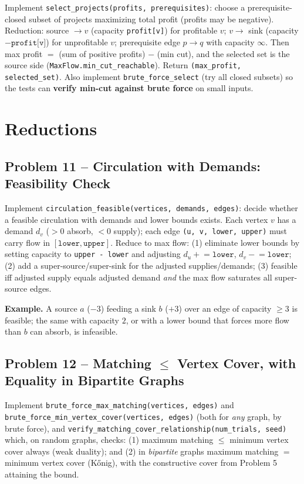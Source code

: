 \documentclass[11pt]{article}
\begin{document}
Implement \texttt{select\_projects(profits, prerequisites)}: choose a prerequisite-closed
subset of projects maximizing total profit (profits may be negative). Reduction: source
$\to v$ (capacity \texttt{profit[v]}) for profitable $v$; $v \to$ sink (capacity
$-\texttt{profit[v]}$) for unprofitable $v$; prerequisite edge $p \to q$ with capacity
$\infty$. Then max profit $=$ (sum of positive profits) $-$ (min cut), and the selected
set is the source side (\texttt{MaxFlow.min\_cut\_reachable}). Return
\texttt{(max\_profit, selected\_set)}. Also implement \texttt{brute\_force\_select} (try
all closed subsets) so the tests can \textbf{verify min-cut against brute force} on small
inputs.

\newpage
\section{Reductions}

\subsection*{Problem 11 -- Circulation with Demands: Feasibility Check}

Implement \texttt{circulation\_feasible(vertices, demands, edges)}: decide whether a
feasible circulation with demands and lower bounds exists. Each vertex $v$ has a demand
$d_v$ ($>0$ absorb, $<0$ supply); each edge \texttt{(u, v, lower, upper)} must carry flow
in $[\texttt{lower}, \texttt{upper}]$. Reduce to max flow: (1) eliminate lower bounds by
setting capacity to \texttt{upper - lower} and adjusting $d_u \mathrel{+}= \texttt{lower}$,
$d_v \mathrel{-}= \texttt{lower}$; (2) add a super-source/super-sink for the adjusted
supplies/demands; (3) feasible iff adjusted supply equals adjusted demand \emph{and} the
max flow saturates all super-source edges.

\textbf{Example.} A source $a$ ($-3$) feeding a sink $b$ ($+3$) over an edge of capacity
$\ge 3$ is feasible; the same with capacity $2$, or with a lower bound that forces more
flow than $b$ can absorb, is infeasible.

\subsection*{Problem 12 -- Matching $\le$ Vertex Cover, with Equality in Bipartite Graphs}

Implement \texttt{brute\_force\_max\_matching(vertices, edges)} and
\texttt{brute\_force\_min\_vertex\_cover(vertices, edges)} (both for \emph{any} graph, by
brute force), and \texttt{verify\_matching\_cover\_relationship(num\_trials, seed)} which,
on random graphs, checks: (1) maximum matching $\le$ minimum vertex cover always (weak
duality); and (2) in \emph{bipartite} graphs maximum matching $=$ minimum vertex cover
(K\H{o}nig), with the constructive cover from Problem 5 attaining the bound.
\end{document}
